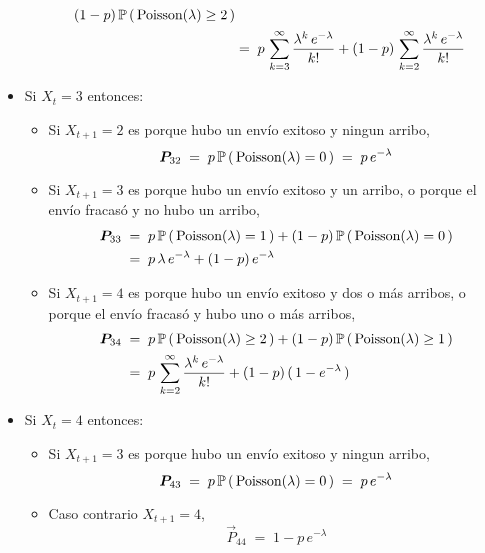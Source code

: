 \documentclass[ a4paper, twoside, 11pt]{article}
\begin{document}
\begin{problem}
\begin{itemize}
\begin{itemize}
\begin{align*}
(1-p) \, \mathbb{P} \, ( \, \text{Poisson}(\lambda) \geq 2 \, ) \\
& = \; 
p \, \sum_{k=3}^{\infty} \frac{\lambda^k \, e^{-\lambda}}{k!} 
+ (1-p) \, \sum_{k=2}^{\infty} \frac{\lambda^k \, e^{-\lambda}}{k!} 
\end{align*}
\end{itemize}
\item Si $X_t = 3$ entonces: 
\begin{itemize}
\item Si $X_{t+1} = 2$ es porque hubo un env\'io exitoso y ningun arribo, \iec 
\[
{\boldsymbol{P}}_{32} \; = \;
p \, \mathbb{P} \, ( \, \text{Poisson}(\lambda) = 0 \, ) \; = \; 
p \, e^{-\lambda}
\]
\item Si $X_{t+1} = 3$ es porque hubo un env\'io exitoso y un arribo, o porque el env\'io fracas\'o y no hubo un arribo, \iec 
\begin{align*}
{\boldsymbol{P}}_{33} \; 
& = \; p \, \mathbb{P} \, ( \, \text{Poisson}(\lambda) = 1 \, ) + 
(1-p) \, \mathbb{P} \, ( \, \text{Poisson}(\lambda) = 0 \, ) \\
& = \; p \, \lambda \, e^{-\lambda} + (1-p) \, e^{-\lambda}
\end{align*}
\item Si $X_{t+1} = 4$ es porque hubo un env\'io exitoso y dos o m\'as arribos, o porque el env\'io fracas\'o y hubo uno o m\'as arribos, \iec 
\begin{align*}
{\boldsymbol{P}}_{34} \; 
& = \; p \, \mathbb{P} \, ( \, \text{Poisson}(\lambda) \geq 2 \, ) + 
(1-p) \, \mathbb{P} \, ( \, \text{Poisson}(\lambda) \geq 1 \, ) \\
& = \; 
p \, \sum_{k=2}^{\infty} \frac{\lambda^k \, e^{-\lambda}}{k!} 
+ (1-p) \, ( \, 1 - e^{-\lambda} \, )
\end{align*}
\end{itemize}
\item Si $X_t = 4$ entonces: 
\begin{itemize}
\item Si $X_{t+1} = 3$ es porque hubo un env\'io exitoso y ningun arribo, \iec 
\[
{\boldsymbol{P}}_{43} \; = \;
p \, \mathbb{P} \, ( \, \text{Poisson}(\lambda) = 0 \, ) \; = \; 
p \, e^{-\lambda}
\]
\item Caso contrario $X_{t+1} = 4$, \iec 
\[
\vec{P}_{44} \; = \; 1 - p \, e^{-\lambda}
\]
\end{itemize}

\end{itemize}


\end{problem}
\vspace{\baselineskip}
\end{document}
